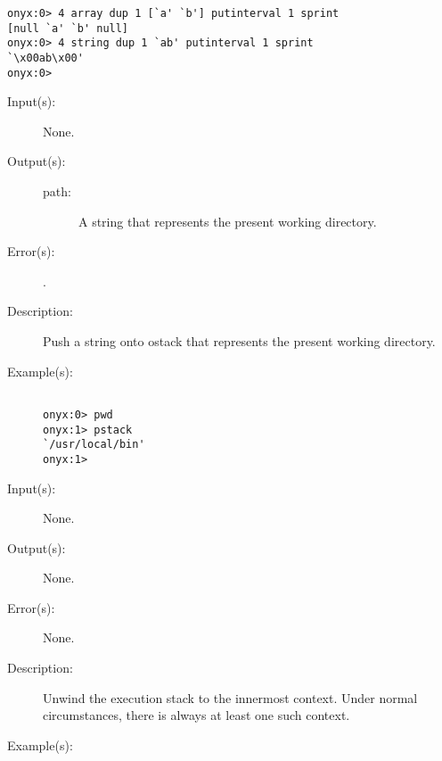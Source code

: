 \begin{description}
\begin{description}
\begin{verbatim}
onyx:0> 4 array dup 1 [`a' `b'] putinterval 1 sprint
[null `a' `b' null]
onyx:0> 4 string dup 1 `ab' putinterval 1 sprint
`\x00ab\x00'
onyx:0>
		\end{verbatim}
	\end{description}
\label{systemdict:pwd}
\item[{\onyxop{--}{pwd}{path}}: ]
	\begin{description}\item[]
	\item[Input(s): ] None.
	\item[Output(s): ]
		\begin{description}\item[]
		\item[path: ]
			A string that represents the present working directory.
		\end{description}
	\item[Error(s): ]
		\begin{description}\item[]
		\item[.]
		\end{description}
	\item[Description: ]
		Push a string onto ostack that represents the present working
		directory.
	\item[Example(s): ]\begin{verbatim}

onyx:0> pwd
onyx:1> pstack
`/usr/local/bin'
onyx:1>
		\end{verbatim}
	\end{description}
\label{systemdict:quit}
\item[{\onyxop{--}{quit}{--}}: ]
	\begin{description}\item[]
	\item[Input(s): ] None.
	\item[Output(s): ] None.
	\item[Error(s): ] None.
	\item[Description: ]
		Unwind the execution stack to the innermost
		 context.  Under
		normal circumstances, there is always at least one such context.
	\item[Example(s): ]\begin{verbatim}


\end{verbatim}
\end{description}
\end{description}
